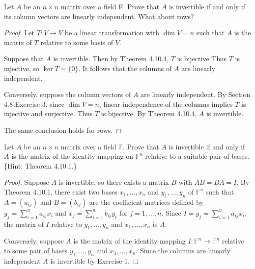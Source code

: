 \begin{tcolorbox}[title=Problem 1, breakable]
Let $A$ be an $n \times n$ matrix over a field F. 
Prove that $A$ is invertible if and only if its column vectors are linearly independent. 
What about rows?
\end{tcolorbox}

\begin{proof}
    Let $T : V \longrightarrow V$ be a linear transformation with $\dim V = n$
    such that $A$ is the matrix of $T$ relative to some basis of $V$.

    Suppose that $A$ is invertible.
    Then by Theorem 4.10.4, $T$ is bijective
    Thus $T$ is injective, so $\ker T = \{0\}$.
    It follows that the columns of $A$ are linearly independent.

    Conversely, suppose the column vectors of $A$ are linearly independent.
    By Section 4.8 Exercise 3, since $\dim V = n$,
        linear independence of the columns implies $T$ is injective and surjective.
    Thus $T$ is bijective.
    By Theorem 4.10.4, $A$ is invertible.

    The same conclusion holds for rows.
\end{proof}

\begin{tcolorbox}[title=Problem 2, breakable]
Let $A$ be an $n \times n$ matrix over a field $\mathbb{F}$. 
Prove that $A$ is invertible if and only if $A$ is the matrix of the identity
mapping on $\mathbb{F}^n$ relative to a suitable pair of bases. \{Hint: Theorem 4.10.1.\}
\end{tcolorbox}

\begin{proof}
    Suppose $A$ is invertible, so there exists a matrix $B$ with $AB = BA = I$.
    By Theorem 4.10.1, there exist two bases $x_1, \ldots, x_n$ and $y_1, \ldots, y_n$
        of $\mathbb{F}^n$ such that $A = (a_{ij})$ and $B = (b_{ij})$ are the coefficient
        matrices defined by $y_j = \sum_{i=1}^n a_{ij} x_i$ and
        $x_j = \sum_{i=1}^n b_{ij} y_i$ for $j = 1, \ldots, n$.
    Since $I = y_j = \sum_{i=1}^n a_{ij} x_i$, the matrix of
        $I$ relative to $y_1,\ldots,y_n$ and $x_1,\ldots,x_n$ is $A$.

    Conversely, suppose $A$ is the matrix of the identity mapping $I : \mathbb{F}^n \to \mathbb{F}^n$
        relative to some pair of bases $y_1, \ldots, y_n$ and $x_1, \ldots, x_n$.
    Since the columns are linearly independent $A$ is invertible by Exercise 1.
\end{proof}

